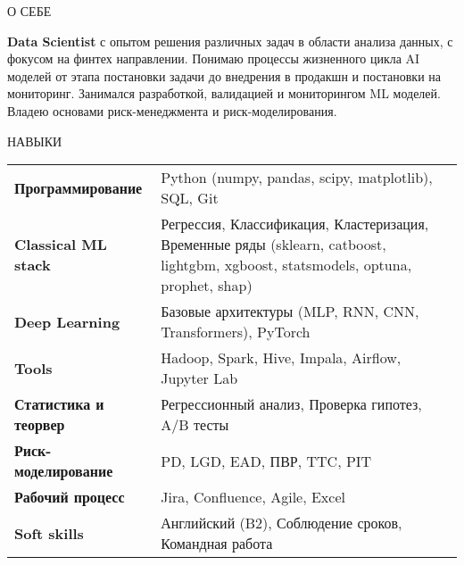 \documentclass{resume} %
\begin{document}
\large
\begin{rSection}{О СЕБЕ} %

{\textbf{Data Scientist} с опытом решения различных задач в области анализа данных, с фокусом на финтех направлении. Понимаю процессы жизненного цикла AI моделей от этапа постановки задачи до внедрения в продакшн и постановки на мониторинг. Занимался разработкой, валидацией и мониторингом ML моделей. Владею основами риск-менеджмента и риск-моделирования.} %

\end{rSection}

\begin{rSection}{НАВЫКИ} %

\begin{tabular}{ @{} >{\bfseries}l @{\hspace{3ex}} p{} }
Программирование & Python (numpy, pandas, scipy, matplotlib), SQL, Git %
\\
Classical ML stack
& Регрессия, Классификация, Кластеризация, Временные ряды (sklearn, catboost, lightgbm, xgboost, statsmodels, optuna, prophet, shap) 
\\
Deep Learning & Базовые архитектуры (MLP, RNN, CNN, Transformers), PyTorch
\\
Tools & Hadoop, Spark, Hive, Impala, Airflow, Jupyter Lab
\\
Статистика и теорвер & Регрессионный анализ, Проверка гипотез, A/B тесты %
\\
Риск-моделирование & PD, LGD, EAD, ПВР, TTC, PIT %
\\
Рабочий процесс & Jira, Confluence, Agile, Excel %
\\
Soft skills & Английский (B2), Соблюдение сроков, Командная работа %
\\
\end{tabular}\\

\end{rSection}
\end{document}
